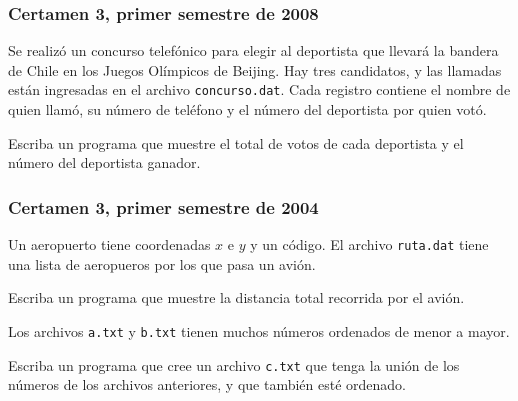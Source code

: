 \documentclass[12pt]{beamer}
\begin{document}
  \begin{frame}
    \frametitle{Certamen 3, primer semestre de 2008}
    Se realizó un concurso telefónico
    para elegir al deportista que llevará la bandera de Chile
    en los Juegos Olímpicos de Beijing.
    Hay tres candidatos, y las llamadas están ingresadas
    en el archivo \texttt{concurso.dat}.
    Cada registro contiene el nombre de quien llamó,
    su número de teléfono
    y el número del deportista por quien votó.

    Escriba un programa
    que muestre el total de votos de cada deportista
    y el número del deportista ganador.
  \end{frame}

  \begin{frame}
    \frametitle{Certamen 3, primer semestre de 2004}
    Un aeropuerto tiene coordenadas $x$ e $y$ y un código.
    El archivo \texttt{ruta.dat} tiene una lista de aeropueros
    por los que pasa un avión.

    Escriba un programa que muestre la distancia total
    recorrida por el avión.
  \end{frame}

  \begin{frame}
    Los archivos \texttt{a.txt} y \texttt{b.txt}
    tienen muchos números ordenados de menor a mayor.

    Escriba un programa que cree un archivo \texttt{c.txt}
    que tenga la unión de los números de los archivos anteriores,
    y que también esté ordenado.
  \end{frame}
\end{document}
